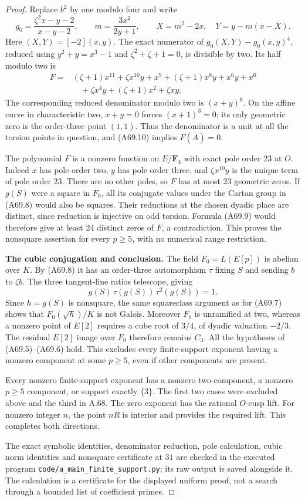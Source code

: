 \begin{proof}
Replace $b^2$ by one modulo four and write
\[
 g_0=\frac{\zeta^2x-y-2}{x-y-2},\qquad
 m=\frac{3x^2}{2y+1},\qquad
 X=m^2-2x,\quad Y=y-m(x-X).
\]
Here $(X,Y)=[-2](x,y)$. The exact numerator
of $g_0(X,Y)-g_0(x,y)^4$, reduced using
$y^2+y=x^3-1$ and $\zeta^2+\zeta+1=0$,
is divisible by two. Its half modulo two is
\begin{align*}
 F={}&(\zeta+1)x^{11}+\zeta x^{10}y+x^9
       +(\zeta+1)x^8y+x^6y+x^6\\
    &\quad+\zeta x^4y+(\zeta+1)x^2+\zeta xy.
 \tag{A69.11}
\end{align*}
The corresponding reduced denominator
modulo two is $(x+y)^8$.
On the affine curve in characteristic two,
$x+y=0$ forces $(x+1)^3=0$; its only
geometric zero is the order-three point
$(1,1)$. Thus the denominator is a unit
at all the torsion points in question,
and (A69.10) implies $F(\overline A)=0$.

The polynomial $F$ is a nonzero function
on $E/\mathbf F_4$ with exact pole order
$23$ at $O$. Indeed $x$ has pole order
two, $y$ has pole order three, and
$\zeta x^{10}y$ is the unique term of
pole order $23$. There are no other poles,
so $F$ has at most $23$ geometric zeros.
If $g(S)$ were a square in $F_0$, all its
conjugate values under the Cartan group
in (A69.8) would also be squares.
Their reductions at the chosen dyadic
place are distinct, since reduction is
injective on odd torsion. Formula
(A69.9) would therefore give at least
$24$ distinct zeros of $F$, a contradiction.
This proves the nonsquare assertion
for every $p\ge5$, with no numerical
range restriction.

\par\smallskip\noindent\textbf{The cubic conjugation and conclusion.}\enspace
The field $F_0=L(E[p])$ is abelian over
$K$. By (A69.8) it has an order-three
automorphism $\tau$ fixing $S$ and
sending $b$ to $\zeta b$. The three
tangent-line ratios telescope, giving
\[
 g(S)\,\tau(g(S))\,\tau^2(g(S))=1.
 \tag{A69.12}
\]
Since $h=g(S)$ is nonsquare, the same
squareclass argument as for (A69.7)
shows that $F_0(\sqrt h)/K$ is not
Galois. Moreover $F_0$ is unramified
at two, whereas a nonzero point of
$E[2]$ requires a cube root of $3/4$,
of dyadic valuation $-2/3$. The
residual $E[2]$ image over $F_0$
therefore remains $C_3$. All the
hypotheses of (A69.5)--(A69.6) hold.
This excludes every finite-support
exponent having a nonzero component
at some $p\ge5$, even if other
components are present.

Every nonzero finite-support exponent
has a nonzero two-component, a nonzero
$p\ge5$ component, or support exactly
$\{3\}$. The first two cases were
excluded above and the third in A.68.
The zero exponent has the rational
$O$-cusp lift. For nonzero integer
$n$, the point $nR$ is interior and
provides the required lift. This
completes both directions.

The exact symbolic identities,
denominator reduction, pole calculation,
cubic norm identities and nonsquare
certificate at $31$ are checked in the
executed program
\texttt{code/a\_main\_finite\_support.py};
its raw output is saved alongside it.
The calculation is a certificate for
the displayed uniform proof, not a
search through a bounded list of
coefficient primes.
\end{proof}

